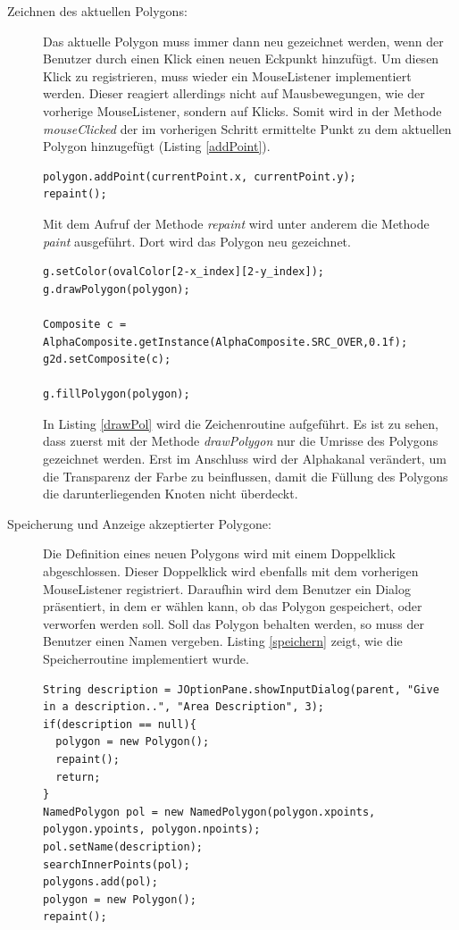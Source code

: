 \begin{description}
\item[Zeichnen des aktuellen Polygons:] Das aktuelle Polygon muss immer dann neu gezeichnet werden, wenn der Benutzer durch einen Klick einen neuen Eckpunkt hinzufügt. Um diesen Klick zu registrieren, muss wieder ein MouseListener implementiert werden. Dieser reagiert allerdings nicht auf Mausbewegungen, wie der vorherige MouseListener, sondern auf Klicks. Somit wird in der Methode \emph{mouseClicked} der im vorherigen Schritt ermittelte Punkt zu dem aktuellen Polygon hinzugefügt (Listing \ref{addPoint}).
\begin{lstlisting}[captionpos=b, caption=Neuen Punkt zum Polygon hinzufügen, label=addPoint]
polygon.addPoint(currentPoint.x, currentPoint.y);
repaint();
\end{lstlisting}

Mit dem Aufruf der Methode \emph{repaint} wird unter anderem die Methode \emph{paint} ausgeführt. Dort wird das Polygon neu gezeichnet.
\begin{lstlisting}[captionpos=b, caption=Zeichnen des Polygons, label=drawPol]
g.setColor(ovalColor[2-x_index][2-y_index]);
g.drawPolygon(polygon);

Composite c = AlphaComposite.getInstance(AlphaComposite.SRC_OVER,0.1f);
g2d.setComposite(c);

g.fillPolygon(polygon);
\end{lstlisting}

In Listing \ref{drawPol} wird die Zeichenroutine aufgeführt. Es ist zu sehen, dass zuerst mit der Methode \emph{drawPolygon} nur die Umrisse des Polygons gezeichnet werden. Erst im Anschluss wird der Alphakanal verändert, um die Transparenz der Farbe zu beinflussen, damit die Füllung des Polygons die darunterliegenden Knoten nicht überdeckt.

\item[Speicherung und Anzeige akzeptierter Polygone:] Die Definition eines neuen Polygons wird mit einem Doppelklick abgeschlossen. Dieser Doppelklick wird ebenfalls mit dem vorherigen MouseListener registriert. Daraufhin wird dem Benutzer ein Dialog präsentiert, in dem er wählen kann, ob das Polygon gespeichert, oder verworfen werden soll. Soll das Polygon behalten werden, so muss der Benutzer einen Namen vergeben. Listing \ref{speichern} zeigt, wie die Speicherroutine implementiert wurde.
\begin{lstlisting}[captionpos=b, caption=Routine zum Speichern eines Polygons, label=speichern]
String description = JOptionPane.showInputDialog(parent, "Give in a description..", "Area Description", 3);
if(description == null){
  polygon = new Polygon();
  repaint();
  return;
}  
NamedPolygon pol = new NamedPolygon(polygon.xpoints, polygon.ypoints, polygon.npoints);
pol.setName(description);
searchInnerPoints(pol);
polygons.add(pol);
polygon = new Polygon();
repaint();
\end{lstlisting}


\end{description}
